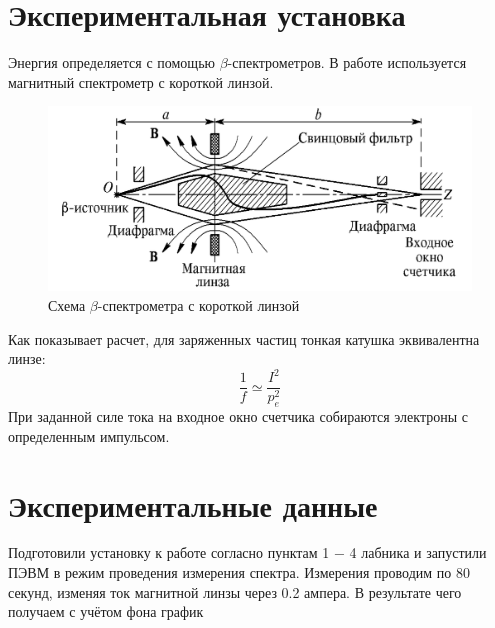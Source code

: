 \documentclass[a4paper,12pt]{article}
\begin{document}
		\section{Экспериментальная установка}
		Энергия определяется с помощью $\beta$-спектрометров. В работе используется магнитный спектрометр с короткой линзой.
		\begin{figure}
			\centering
			\includegraphics[width=0.8\linewidth]{pic2}
			\caption{Схема $\beta$-спектрометра с короткой линзой}
		\end{figure}
		Как показывает расчет, для заряженных частиц тонкая катушка эквивалентна линзе:
		\begin{equation}
			\frac{1}{f} \simeq \frac{I^2}{p_e^2}
		\end{equation}
		При заданной силе тока на входное окно счетчика собираются электроны с определенным импульсом.

    \section{Экспериментальные данные}
    Подготовили установку к работе согласно пунктам 1 − 4 лабника и запустили ПЭВМ в режим проведения измерения спектра. Измерения проводим по 80 секунд, изменяя ток магнитной линзы через 0.2 ампера. В результате чего получаем с учётом фона график
    
\end{document}
